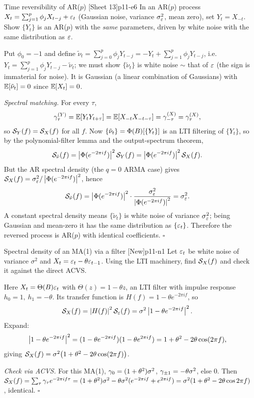 \begin{exercise}{Time reversibility of AR($p$) \quad\textnormal{[Sheet 13]}}{p11-e6}
In an AR($p$) process $X_t=\sum_{j=1}^p\phi_j X_{t-j}+\varepsilon_t$ (Gaussian noise,
variance $\sigma_\varepsilon^2$, mean zero), set $Y_t=X_{-t}$. Show $\{Y_t\}$ is an
AR($p$) with the \emph{same} parameters, driven by white noise with the same
distribution as $\varepsilon$.
\end{exercise}
\begin{solution}
Put $\phi_0=-1$ and define $\tilde\nu_t=\sum_{j=0}^p\phi_j Y_{t-j}
=-Y_t+\sum_{j=1}^p\phi_j Y_{t-j}$, i.e.\ $Y_t=\sum_{j=1}^p\phi_j Y_{t-j}
-\tilde\nu_t$; we must show $\{\tilde\nu_t\}$ is white noise $\sim$ that of
$\varepsilon$ (the sign is immaterial for noise). It is Gaussian (a linear
combination of Gaussians) with $\mathbb{E}[\tilde\nu_t]=0$ since $\mathbb{E}[X_t]=0$.

\emph{Spectral matching.} For every $\tau$,
\[
\gamma^{(Y)}_\tau=\mathbb{E}[Y_t Y_{t+\tau}]=\mathbb{E}[X_{-t}X_{-t-\tau}]
=\gamma^{(X)}_{-\tau}=\gamma^{(X)}_\tau,
\]
so $\mathcal{S}_Y(f)=\mathcal{S}_X(f)$ for all $f$. Now $\{\tilde\nu_t\}=\Phi(B)[\{Y_t\}]$
is an LTI filtering of $\{Y_t\}$, so by the polynomial-filter lemma and the
output-spectrum theorem,
\[
\mathcal{S}_{\tilde\nu}(f)=\left\lvert \Phi(e^{-2\pi i f}) \right\rvert^2\mathcal{S}_Y(f)
=\left\lvert \Phi(e^{-2\pi i f}) \right\rvert^2\mathcal{S}_X(f).
\]
But the AR spectral density (the $q=0$ ARMA case) gives
$\mathcal{S}_X(f)=\sigma_\varepsilon^2/\left\lvert \Phi(e^{-2\pi i f}) \right\rvert^2$, hence
\[
\mathcal{S}_{\tilde\nu}(f)=\left\lvert \Phi(e^{-2\pi i f}) \right\rvert^2\cdot
\frac{\sigma_\varepsilon^2}{\left\lvert \Phi(e^{-2\pi i f}) \right\rvert^2}=\sigma_\varepsilon^2 .
\]
A constant spectral density means $\{\tilde\nu_t\}$ is white noise of variance
$\sigma_\varepsilon^2$; being Gaussian and mean-zero it has the same distribution as
$\{\varepsilon_t\}$. Therefore the reversed process is AR($p$) with identical
coefficients. \hfill$\square$
\end{solution}

\begin{exercise}{Spectral density of an MA(1) via a filter \quad\textnormal{[New]}}{p11-n1}
Let $\varepsilon_t$ be white noise of variance $\sigma^2$ and $X_t=\varepsilon_t-\theta\varepsilon_{t-1}$.
Using the LTI machinery, find $\mathcal{S}_X(f)$ and check it against the direct ACVS.
\end{exercise}
\begin{solution}
Here $X_t=\Theta(B)\varepsilon_t$ with $\Theta(z)=1-\theta z$, an LTI filter with
impulse response $h_0=1,\ h_1=-\theta$. Its transfer function is
$H(f)=1-\theta e^{-2\pi i f}$, so
\[
\mathcal{S}_X(f)=\left\lvert H(f) \right\rvert^2\mathcal{S}_\varepsilon(f)=\sigma^2\left\lvert 1-\theta e^{-2\pi i f} \right\rvert^2 .
\]
Expand:
\[
\left\lvert 1-\theta e^{-2\pi i f} \right\rvert^2=(1-\theta e^{-2\pi i f})(1-\theta e^{2\pi i f})
=1+\theta^2-2\theta\cos(2\pi f),
\]
giving $\mathcal{S}_X(f)=\sigma^2\big(1+\theta^2-2\theta\cos(2\pi f)\big)$.

\emph{Check via ACVS.} For this MA(1), $\gamma_0=(1+\theta^2)\sigma^2$,
$\gamma_{\pm1}=-\theta\sigma^2$, else $0$. Then
$\mathcal{S}_X(f)=\sum_\tau\gamma_\tau e^{-2\pi i f\tau}
=(1+\theta^2)\sigma^2-\theta\sigma^2(e^{-2\pi i f}+e^{2\pi i f})
=\sigma^2(1+\theta^2-2\theta\cos 2\pi f)$, identical. \hfill$\square$
\end{solution}

